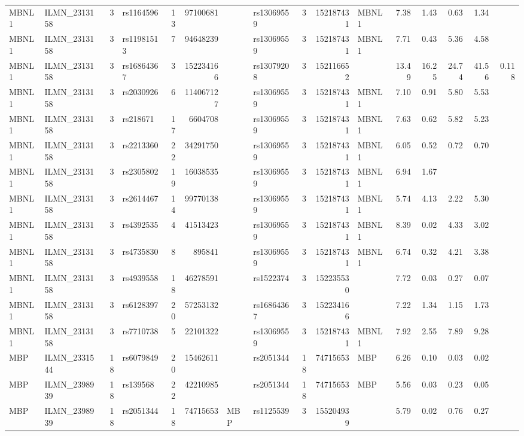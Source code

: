 \documentclass{article}
\begin{document}
\begin{landscape}
{\begin{ThreePartTable}
\begin{longtable}{|llr|lrrl|lrrl|rrrr|r|}
MBNL1 & ILMN\_2313158 & 3 & rs1164596 & 13 & 97100681 &  & rs13069559 & 3 & 152187431 & MBNL1 & 7.38 & 1.43 & 0.63 & 1.34 &  \\
MBNL1 & ILMN\_2313158 & 3 & rs11981513 & 7 & 94648239 &  & rs13069559 & 3 & 152187431 & MBNL1 & 7.71 & 0.43 & 5.36 & 4.58 &  \\
MBNL1 & ILMN\_2313158 & 3 & rs16864367 & 3 & 152234166 &  & rs13079208 & 3 & 152116652 &  & 13.49 & 16.25 & 24.74 & 41.56 & 0.118 \\
MBNL1 & ILMN\_2313158 & 3 & rs2030926 & 6 & 114067127 &  & rs13069559 & 3 & 152187431 & MBNL1 & 7.10 & 0.91 & 5.80 & 5.53 &  \\
MBNL1 & ILMN\_2313158 & 3 & rs218671 & 17 & 6604708 &  & rs13069559 & 3 & 152187431 & MBNL1 & 7.63 & 0.62 & 5.82 & 5.23 &  \\
MBNL1 & ILMN\_2313158 & 3 & rs2213360 & 22 & 34291750 &  & rs13069559 & 3 & 152187431 & MBNL1 & 6.05 & 0.52 & 0.72 & 0.70 &  \\
MBNL1 & ILMN\_2313158 & 3 & rs2305802 & 19 & 16038535 &  & rs13069559 & 3 & 152187431 & MBNL1 & 6.94 & 1.67 &  &  &  \\
MBNL1 & ILMN\_2313158 & 3 & rs2614467 & 14 & 99770138 &  & rs13069559 & 3 & 152187431 & MBNL1 & 5.74 & 4.13 & 2.22 & 5.30 &  \\
MBNL1 & ILMN\_2313158 & 3 & rs4392535 & 4 & 41513423 &  & rs13069559 & 3 & 152187431 & MBNL1 & 8.39 & 0.02 & 4.33 & 3.02 &  \\
MBNL1 & ILMN\_2313158 & 3 & rs4735830 & 8 & 895841 &  & rs13069559 & 3 & 152187431 & MBNL1 & 6.74 & 0.32 & 4.21 & 3.38 &  \\
MBNL1 & ILMN\_2313158 & 3 & rs4939558 & 18 & 46278591 &  & rs1522374 & 3 & 152235530 &  & 7.72 & 0.03 & 0.27 & 0.07 &  \\
MBNL1 & ILMN\_2313158 & 3 & rs6128397 & 20 & 57253132 &  & rs16864367 & 3 & 152234166 &  & 7.22 & 1.34 & 1.15 & 1.73 &  \\
MBNL1 & ILMN\_2313158 & 3 & rs7710738 & 5 & 22101322 &  & rs13069559 & 3 & 152187431 & MBNL1 & 7.92 & 2.55 & 7.89 & 9.28 &  \\
MBP & ILMN\_2331544 & 18 & rs6079849 & 20 & 15462611 &  & rs2051344 & 18 & 74715653 & MBP & 6.26 & 0.10 & 0.03 & 0.02 &  \\
MBP & ILMN\_2398939 & 18 & rs139568 & 22 & 42210985 &  & rs2051344 & 18 & 74715653 & MBP & 5.56 & 0.03 & 0.23 & 0.05 &  \\
MBP & ILMN\_2398939 & 18 & rs2051344 & 18 & 74715653 & MBP & rs1125539 & 3 & 155204939 &  & 5.79 & 0.02 & 0.76 & 0.27 &  \\

\end{longtable}
\end{ThreePartTable}}
\end{landscape}
\end{document}
